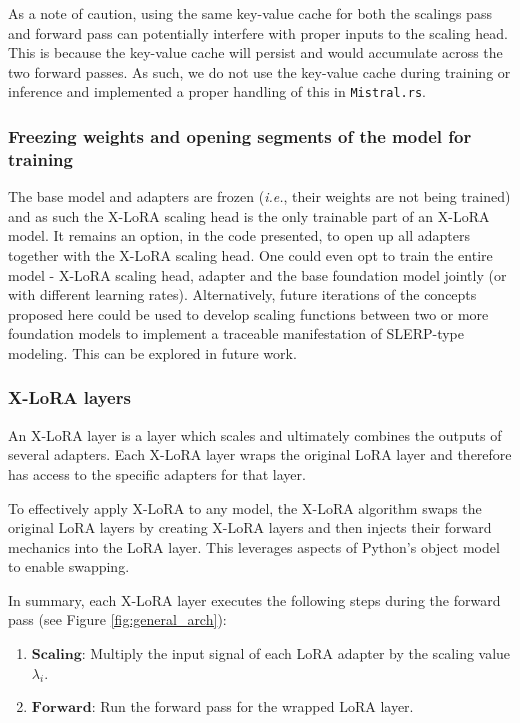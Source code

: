 As a note of caution, using the same key-value cache for both the scalings pass and forward pass can potentially interfere with proper inputs to the scaling head. This is because the key-value cache will persist and would accumulate across the two forward passes. As such, we do not use the key-value cache during training or inference and implemented a proper handling of this in \texttt{Mistral.rs}.

\subsubsection{Freezing weights and opening segments of the model for training}
The base model and adapters are frozen ({\it i.e.}, their weights are not being trained) and as such the X-LoRA scaling head is the only trainable part of an X-LoRA model. It remains an option, in the code presented, to open up all adapters together with the X-LoRA scaling head. One could even opt to train the entire model - X-LoRA scaling head, adapter and the base foundation model jointly (or with different learning rates). Alternatively, future iterations of the concepts proposed here could be used to develop scaling functions between two or more foundation models to implement a traceable manifestation of SLERP-type modeling. This can be explored in future work. 

\subsubsection{X-LoRA layers}
An X-LoRA layer is a layer which scales and ultimately combines the outputs of several adapters. Each X-LoRA layer wraps the original LoRA layer and therefore has access to the specific adapters for that layer.

To effectively apply X-LoRA to any model, the X-LoRA algorithm swaps the original LoRA layers by creating X-LoRA layers and then injects their forward mechanics into the LoRA layer. This leverages aspects of Python's object model to enable swapping.

In summary, each X-LoRA layer executes the following steps during the forward pass (see Figure \ref{fig:general_arch}):
\begin{enumerate}
    \item $\mathbf{Scaling}$: Multiply the input signal of each LoRA adapter by the scaling value $\lambda_i$.
    \item $\mathbf{Forward}$: Run the forward pass for the wrapped LoRA layer.
\end{enumerate}


